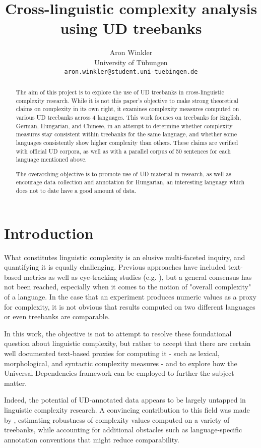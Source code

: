 \documentclass[11pt]{article}
\title{Cross-linguistic complexity analysis using UD treebanks}
\author{Aron Winkler \\
  University of Tübungen \\
  \texttt{aron.winkler@student.uni-tuebingen.de}}
\begin{document}
\maketitle
\begin{abstract}
    The aim of this project is to explore the use of UD treebanks in cross-linguistic complexity research. While it is not this paper's objective to make strong theoretical claims on complexity in its own right, it examines complexity measures computed on various UD treebanks across 4 languages. This work focuses on treebanks for English, German, Hungarian, and Chinese, in an attempt to determine whether complexity measures stay consistent within treebanks for the same language, and whether some languages consistently show higher complexity than others. These claims are verified with official UD corpora, as well as with a parallel corpus of 50 sentences for each language mentioned above.

    The overarching objective is to promote use of UD material in research, as well as encourage data collection and annotation for Hungarian, an interesting language which does not to date have a good amount of data.
\end{abstract}

\section{Introduction}

What constitutes linguistic complexity is an elusive multi-faceted inquiry, and quantifying it is equally challenging. Previous approaches have included text-based metrics as well as eye-tracking studies (e.g. \citealp{Lee:2007}), but a general consensus has not been reached, especially when it comes to the notion of "overall complexity" of a language. In the case that an experiment produces numeric values as a proxy for complexity, it is not obvious that results computed on two different languages or even treebanks are comparable.

In this work, the objective is not to attempt to resolve these foundational question about linguistic complexity, but rather to accept that there are certain well documented text-based proxies for computing it - such as lexical, morphological, and syntactic complexity measures - and to explore how the Universal Dependencies framework can be employed to further the subject matter. 

Indeed, the potential of UD-annotated data appears to be largely untapped in linguistic complexity research. A convincing contribution to this field was made by \citealp{berdicevskis-etal-2018-using}, estimating robustness of complexity values computed on a variety of treebanks, while accounting for additional obstacles such as language-specific annotation conventions that might reduce comparability.
\end{document}
